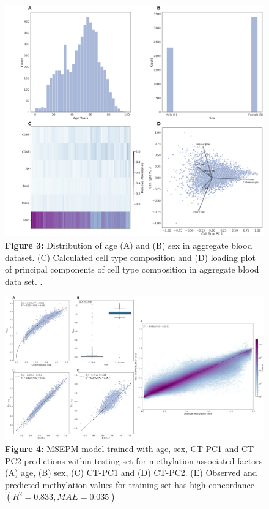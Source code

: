 \documentclass{article}
\begin{document}
{\begin{center}
    \begin{figure}
    \includegraphics[scale=.2]{Figures/Figure3.png}
    \footnotesize
    \caption*{\small \textbf{Figure 3:} Distribution of age (A) and (B) sex in aggregate blood dataset. (C) 
    Calculated cell type composition and (D) loading plot of principal components of cell 
    type composition in aggregate blood data set. .}
    \end{figure}
\end{center}

\begin{raggedleft}
\begin{figure}
\includegraphics[scale=.15]{Figures/Figure4.png}
\footnotesize
\caption*{\small \textbf{Figure 4:} MSEPM model trained with age, sex, CT-PC1 and CT-PC2 predictions within testing 
set for methylation associated factors (A) age, (B) sex, (C) CT-PC1 and (D) CT-PC2. (E) Observed and predicted
 methylation values for training set has high concordance $(R^2=0.833, MAE=0.035)$}
\end{figure}
\end{raggedleft}

}
\end{document}

